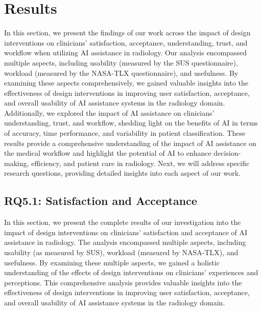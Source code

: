 \section{Results}
\label{sec:chap005006}

In this section, we present the findings of our work across the impact of design interventions on clinicians' satisfaction, acceptance, understanding, trust, and workflow when utilizing \ac{AI} assistance in radiology.
Our analysis encompassed multiple aspects, including usability (measured by the \ac{SUS} questionnaire), workload (measured by the \ac{NASA-TLX} questionnaire), and usefulness.
By examining these aspects comprehensively, we gained valuable insights into the effectiveness of design interventions in improving user satisfaction, acceptance, and overall usability of \ac{AI} assistance systems in the radiology domain.
Additionally, we explored the impact of \ac{AI} assistance on clinicians' understanding, trust, and workflow, shedding light on the benefits of \ac{AI} in terms of accuracy, time performance, and variability in patient classification.
These results provide a comprehensive understanding of the impact of \ac{AI} assistance on the medical workflow and highlight the potential of \ac{AI} to enhance decision-making, efficiency, and patient care in radiology.
Next, we will address specific research questions, providing detailed insights into each aspect of our work.

\subsection{RQ5.1: Satisfaction and Acceptance}
\label{sec:chap005006001}

In this section, we present the complete results of our investigation into the impact of design interventions on clinicians' satisfaction and acceptance of \ac{AI} assistance in radiology.
The analysis encompassed multiple aspects, including usability (as measured by \ac{SUS}), workload (measured by \ac{NASA-TLX}), and usefulness.
By examining these multiple aspects, we gained a holistic understanding of the effects of design interventions on clinicians' experiences and perceptions.
This comprehensive analysis provides valuable insights into the effectiveness of design interventions in improving user satisfaction, acceptance, and overall usability of \ac{AI} assistance systems in the radiology domain.

